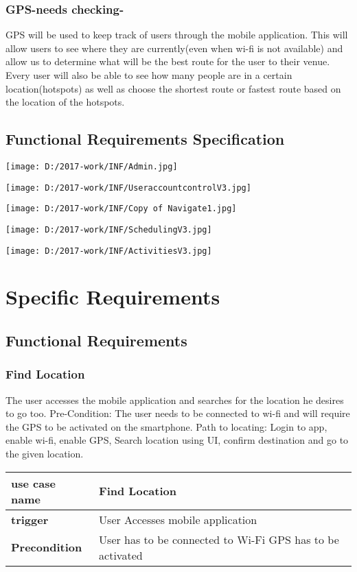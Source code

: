 \documentclass{article}
\begin{document}
\subsubsection{GPS-needs checking-}
GPS will be used to keep track of users through the mobile application. This will allow users to see where they are currently(even when wi-fi is not available) and allow us to determine what will be the best route for the user to their venue. Every user will also be able to see how many people are in a certain location(hotspots) as well as choose the shortest route or fastest route based on the location of the hotspots.
\subsection {Functional Requirements Specification}
\begin{center}
\texttt{[image: D:/2017-work/INF/Admin.jpg]}
\newpage

\texttt{[image: D:/2017-work/INF/UseraccountcontrolV3.jpg]}
\newpage

\texttt{[image: D:/2017-work/INF/Copy of Navigate1.jpg]}
\newpage

\texttt{[image: D:/2017-work/INF/SchedulingV3.jpg]}




\texttt{[image: D:/2017-work/INF/ActivitiesV3.jpg]}
\newpage
\centering
\section{Specific Requirements}
\subsection{Functional Requirements}
\subsubsection{Find Location}
The user accesses the mobile application and searches for the location he desires to go too. Pre-Condition: The user needs to be connected to wi-fi and will require the GPS to be activated on the smartphone. Path to locating: Login to app, enable wi-fi, enable GPS, Search location using UI, confirm destination and go to the given location.

\begin{tabu} to 0.8\textwidth { | X[l] | X[c]| }
 \hline

\textbf{use case name} & Find Location \\
 \hline
\textbf{trigger} & User Accesses mobile application    \\
 \hline
\textbf{Precondition} &User has to be connected to Wi-Fi
GPS has to be activated



\end{tabu}
\end{center}
\end{document}
